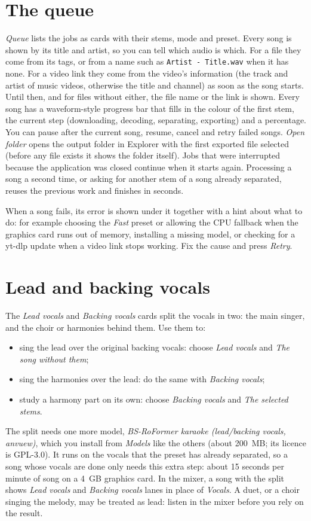\documentclass{covermaker}
\begin{document}
\section{The queue}
\emph{Queue} lists the jobs as cards with their stems, mode and preset. Every
song is shown by its title and artist, so you can tell which audio is which.
For a file they come from its tags, or from a name such as
\texttt{Artist - Title.wav} when it has none. For a video link they come from
the video's information (the track and artist of music videos, otherwise the
title and channel) as soon as the song starts. Until then, and for files
without either, the file name or the link is shown. Every song has a
waveform-style progress bar that fills in the colour of the first
stem, the current step (downloading, decoding, separating, exporting) and a
percentage. You can pause after the current song, resume, cancel and retry
failed songs. \emph{Open folder} opens the output folder in Explorer with the
first exported file selected (before any file exists it shows the folder
itself). Jobs that
were interrupted because the application was closed continue when it starts
again. Processing a song a second time, or asking for another stem of a song
already separated, reuses the previous work and finishes in seconds.

When a song fails, its error is shown under it together with a hint about
what to do: for example choosing the \emph{Fast} preset or allowing the CPU
fallback when the graphics card runs out of memory, installing a missing
model, or checking for a yt-dlp update when a video link stops working.
Fix the cause and press \emph{Retry}.

\section{Lead and backing vocals}\label{sec:lead-backing}
The \emph{Lead vocals} and \emph{Backing vocals} cards split the vocals in
two: the main singer, and the choir or harmonies behind them. Use them to:
\begin{itemize}
  \item sing the lead over the original backing vocals: choose \emph{Lead
        vocals} and \emph{The song without them};
  \item sing the harmonies over the lead: do the same with \emph{Backing
        vocals};
  \item study a harmony part on its own: choose \emph{Backing vocals} and
        \emph{The selected stems}.
\end{itemize}
The split needs one more model, \emph{BS-RoFormer karaoke (lead/backing
vocals, anvuew)}, which you install from \emph{Models} like the others (about
200~MB; its licence is GPL-3.0). It runs on the vocals that the preset has
already separated, so a song whose vocals are done only needs this extra
step: about 15 seconds per minute of song on a 4~GB graphics card. In the
mixer, a song with the split shows \emph{Lead vocals} and \emph{Backing
vocals} lanes in place of \emph{Vocals}. A duet, or a choir singing the
melody, may be treated as lead: listen in the mixer before you rely on the
result.
\end{document}
